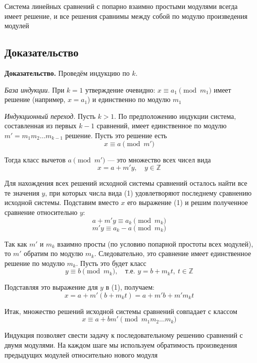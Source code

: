 \documentclass[a4paper,12pt]{article}
\theoremstyle{definition}
\theoremstyle{plain}
\theoremstyle{remark}
\begin{document}
	\begin{tcolorbox}[colback=red!5, colframe=red!70!black, title=Формулировка]
		Система линейных сравнений с попарно взаимно простыми модулями всегда имеет решение, и все решения сравнимы между собой по модулю произведения модулей
	\end{tcolorbox}
	
	\subsection{Доказательство}
	
	\noindent \textbf{Доказательство.}
	Проведём индукцию по $k$.
	
	\textit{База индукции.} При $k = 1$ утверждение очевидно: $x \equiv a_1 \pmod{m_1}$ имеет решение (например, $x = a_1$) и единственно по модулю $m_1$
	
	\textit{Индукционный переход.} Пусть $k > 1$. По предположению индукции система, составленная из первых $k-1$ сравнений, имеет единственное по модулю $m' = m_1 m_2 \dots m_{k-1}$ решение. Пусть это решение есть
	\[
	x \equiv a \pmod{m'}
	\]
	
	Тогда класс вычетов $a \pmod{m'}$ — это множество всех чисел вида
	\[
	x = a + m' y, \quad y \in \mathbb{Z} \tag{1}
	\]
	
	Для нахождения всех решений исходной системы сравнений осталось найти все те значения $y$, при которых числа вида (1) удовлетворяют последнему сравнению исходной системы. Подставим вместо $x$ его выражение (1) и решим полученное сравнение относительно $y$:
	\[
	a + m' y \equiv a_k \pmod{m_k}
	\]
	\[
	m' y \equiv a_k - a \pmod{m_k}
	\]
	
	Так как $m'$ и $m_k$ взаимно просты (по условию попарной простоты всех модулей), то $m'$ обратим по модулю $m_k$. Следовательно, это сравнение имеет единственное решение по модулю $m_k$. Пусть это будет класс
	\[
	y \equiv b \pmod{m_k}, \quad \text{т.е. } y = b + m_k t, \ t \in \mathbb{Z}
	\]
	
	Подставляя это выражение для $y$ в (1), получаем:
	\[
	x = a + m'(b + m_k t) = a + m'b + m'm_k t
	\]
	
	Итак, множество решений исходной системы сравнений совпадает с классом
	\[
	x \equiv a + b m' \pmod{m_1 m_2 \dots m_k}
	\]
	
	\begin{tcolorbox}[colback=green!5, colframe=green!50!black, title=Пояснение]
		Индукция позволяет свести задачу к последовательному решению сравнений с двумя модулями. На каждом шаге мы используем обратимость произведения предыдущих модулей относительно нового модуля
	\end{tcolorbox}
	
\end{document}
